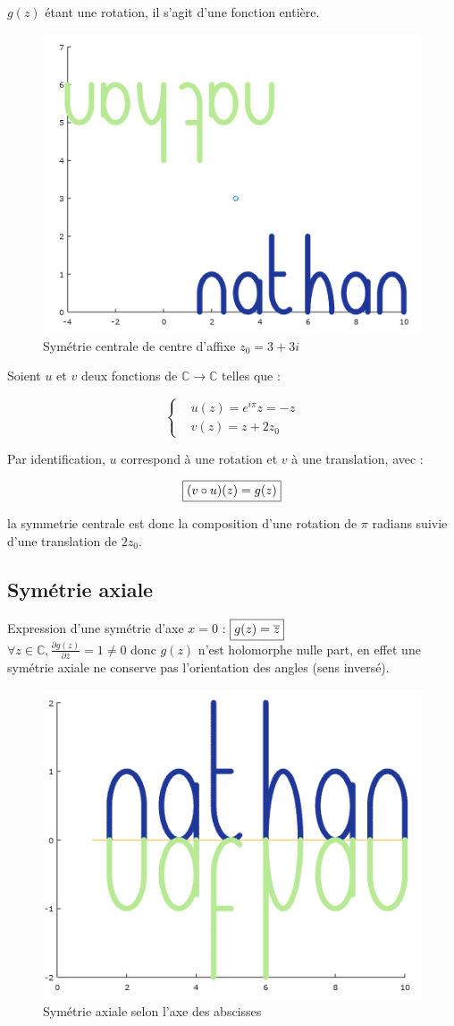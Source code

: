 \documentclass{article}
\begin{document}
    $g(z)$ étant une rotation, il s'agit d'une fonction entière.

    \begin{figure}[ht!]
        \centering
        \includegraphics[height=0.32\textwidth]{figures/sym_centrale.png}
        \caption{Symétrie centrale de centre d'affixe $z_{0} = 3 + 3i$}
    \end{figure}


      Soient $u$ et $v$ deux fonctions de $\mathbb{C} \to \mathbb{C}$ telles que :

      \begin{equation*}
        \left \{
        \begin{aligned}
          &u(z) = e^{i\pi}z = -z \\
          &v(z) = z + 2z_{0}
        \end{aligned} \right.
    \end{equation*} 

    Par identification, $u$ correspond à une rotation et $v$ à une translation, avec :
    
    $$\fbox{$(v \circ u)(z) = g(z)$}$$
    
    la symmetrie centrale est donc la composition d'une rotation de $\pi$ radians suivie d'une 
    translation de $2z_{0}$.


    \subsection{Symétrie axiale}

    Expression d'une symétrie d'axe $x = 0$ : $\fbox{$g(z) = \overline{z}$}$ \\

    $\forall z \in \mathbb{C}, \frac{\partial g(z)}{\partial \overline{z}} = 1 \neq 0$ donc $g(z)$ n'est holomorphe
    nulle part, en effet une symétrie axiale ne conserve pas l'orientation des angles (sens inversé).

    \begin{figure}[ht!]
        \centering
        \includegraphics[height=0.32\textwidth]{figures/sym_axiale.png}
        \caption{Symétrie axiale selon l'axe des abscisses}
    \end{figure}
\end{document}
